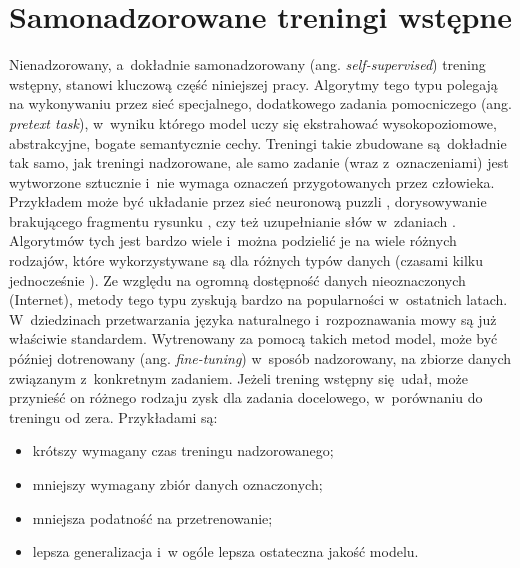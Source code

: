 \section{Samonadzorowane treningi wstępne}

Nienadzorowany, a~dokładnie samonadzorowany (ang. \emph{self-supervised}) trening wstępny, stanowi kluczową część niniejszej pracy. Algorytmy tego typu polegają na wykonywaniu przez sieć specjalnego, dodatkowego zadania pomocniczego (ang. \emph{pretext task}), w~wyniku którego model uczy się ekstrahować wysokopoziomowe, abstrakcyjne, bogate semantycznie cechy. Treningi takie zbudowane są dokładnie tak samo, jak treningi nadzorowane, ale samo zadanie (wraz z~oznaczeniami) jest wytworzone sztucznie i~nie wymaga oznaczeń przygotowanych przez człowieka. Przykładem może być układanie przez sieć neuronową puzzli \cite{noroozi_unsupervised_2017}, dorysowywanie brakującego fragmentu rysunku \cite{pathak_context_2016}, czy też uzupełnianie słów w~zdaniach \cite{devlin_bert_2019}. Algorytmów tych jest bardzo wiele i~można podzielić je na wiele różnych rodzajów, które wykorzystywane są dla różnych typów danych (czasami kilku jednocześnie \cite{jia_scaling_2021}). Ze względu na ogromną dostępność danych nieoznaczonych (Internet), metody tego typu zyskują bardzo na popularności w~ostatnich latach. W~dziedzinach przetwarzania języka naturalnego i~rozpoznawania mowy są już właściwie standardem. Wytrenowany za pomocą takich metod model, może być później dotrenowany (ang. \emph{fine-tuning}) w~sposób nadzorowany, na zbiorze danych związanym z~konkretnym zadaniem. Jeżeli trening wstępny się udał, może przynieść on różnego rodzaju zysk dla zadania docelowego, w~porównaniu do treningu od zera. Przykładami są:
\begin{itemize}
    \item krótszy wymagany czas treningu nadzorowanego;
    \item mniejszy wymagany zbiór danych oznaczonych;
    \item mniejsza podatność na przetrenowanie;
    \item lepsza generalizacja i~w ogóle lepsza ostateczna jakość modelu.
\end{itemize}

